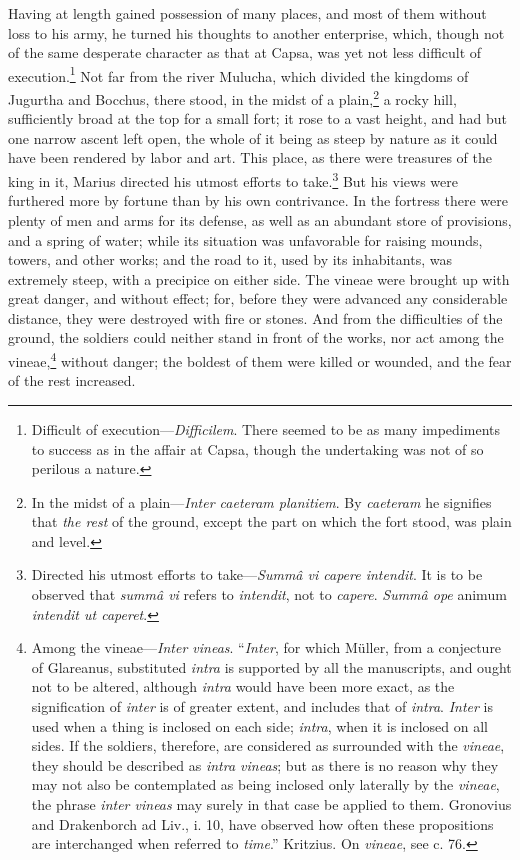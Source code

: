 Having at length gained possession of many places, and most of them
without loss to his army, he turned his thoughts to another enterprise,
which, though not of the same desperate character as that at Capsa, was
yet not less difficult of execution.\footnote{Difficult of execution—\emph{Difficilem}. There seemed to be as
many impediments to success as in the affair at Capsa, though the
undertaking was not of so perilous a nature.} Not far from the river Mulucha,
which divided the kingdoms of Jugurtha and Bocchus, there stood, in the
midst of a plain,\footnote{In the midst of a plain—\emph{Inter caeteram planitiem}. By
\emph{caeteram} he signifies that \emph{the rest} of the ground, except the part
on which the fort stood, was plain and level.} a rocky hill, sufficiently broad at the top for
a small fort; it rose to a vast height, and had but one narrow ascent
left open, the whole of it being as steep by nature as it could have
been rendered by labor and art. This place, as there were treasures of
the king in it, Marius directed his utmost efforts to take.\footnote{Directed his utmost efforts to take—\emph{Summâ vi capere
intendit}. It is to be observed that \emph{summâ vi} refers to \emph{intendit},
not to \emph{capere}. \emph{Summâ ope} animum \emph{intendit ut caperet}.} But
his views were furthered more by fortune than by his own contrivance.
In the fortress there were plenty of men and arms for its defense,
as well as an abundant store of provisions, and a spring of water;
while its situation was unfavorable for raising mounds, towers, and
other works; and the road to it, used by its inhabitants, was extremely
steep, with a precipice on either side. The vineae were brought up with
great danger, and without effect; for, before they were advanced any
considerable distance, they were destroyed with fire or stones. And from
the difficulties of the ground, the soldiers could neither stand in front
of the works, nor act among the vineae,\footnote{Among the vineae—\emph{Inter vineas}. ``\emph{Inter}, for which Müller,
from a conjecture of Glareanus, substituted \emph{intra} is supported by
all the manuscripts, and ought not to be altered, although \emph{intra}
would have been more exact, as the signification of \emph{inter} is of
greater extent, and includes that of \emph{intra}. \emph{Inter} is used when
a thing is inclosed on each side; \emph{intra}, when it is inclosed on
all sides. If the soldiers, therefore, are considered as surrounded
with the \emph{vineae}, they should be described as \emph{intra vineas}; but
as there is no reason why they may not also be contemplated as being
inclosed only laterally by the \emph{vineae}, the phrase \emph{inter vineas}
may surely in that case be applied to them. Gronovius and Drakenborch
ad Liv., i. 10, have observed how often these propositions are
interchanged when referred to \emph{time}.'' Kritzius. On \emph{vineae}, see
c. 76.} without danger; the boldest
of them were killed or wounded, and the fear of the rest increased.

